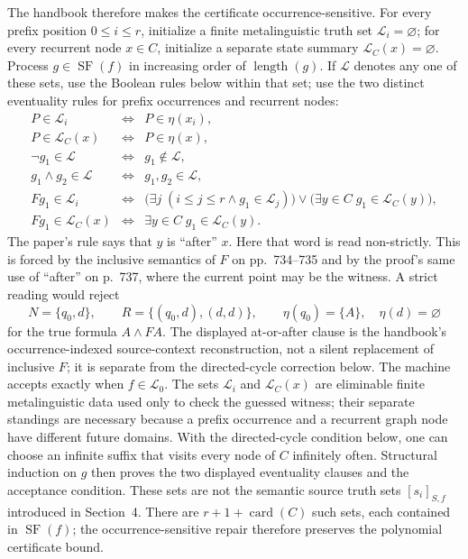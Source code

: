 The handbook therefore makes the certificate occurrence-sensitive.  For every
prefix position \(0\le i\le r\), initialize a finite metalinguistic truth set
\(\mathcal L_i=\varnothing\); for every recurrent node \(x\in C\), initialize
a separate state summary \(\mathcal L_C(x)=\varnothing\).  Process
\(g\in\operatorname{SF}(f)\) in increasing order of
\(\operatorname{length}(g)\).  If \(\mathcal L\) denotes any one of these
sets, use the Boolean rules below within that set; use the two distinct
eventuality rules for prefix occurrences and recurrent nodes:
\[
\begin{array}{rcl}
 P\in\mathcal L_i
 &\Longleftrightarrow& P\in\eta(x_i),\\
 P\in\mathcal L_C(x)
 &\Longleftrightarrow& P\in\eta(x),\\
 \neg g_1\in\mathcal L
 &\Longleftrightarrow& g_1\notin\mathcal L,\\
 g_1\land g_2\in\mathcal L
 &\Longleftrightarrow& g_1,g_2\in\mathcal L,\\
 Fg_1\in\mathcal L_i
 &\Longleftrightarrow&
 \bigl(\exists j\;(i\le j\le r\land g_1\in\mathcal L_j)\bigr)
 \lor
 \bigl(\exists y\in C\;g_1\in\mathcal L_C(y)\bigr),\\
 Fg_1\in\mathcal L_C(x)
 &\Longleftrightarrow&
 \exists y\in C\;g_1\in\mathcal L_C(y).
\end{array}
\]
The paper's rule says that \(y\) is ``after'' \(x\).  Here that word is read
non-strictly.  This is forced by the inclusive semantics of \(F\) on
pp.~734--735 and by the proof's same use of ``after'' on p.~737, where the
current point may be the witness.  A strict reading would reject
\[
 N=\{q_0,d\},\qquad R=\{(q_0,d),(d,d)\},\qquad
 \eta(q_0)=\{A\},\quad\eta(d)=\varnothing
\]
for the true formula \(A\land FA\).  The displayed at-or-after clause is the
handbook's occurrence-indexed source-context reconstruction, not a silent
replacement of inclusive \(F\); it is separate from the directed-cycle
correction below.
The machine accepts exactly when
\(f\in\mathcal L_0\).  The sets \(\mathcal L_i\) and \(\mathcal L_C(x)\) are
eliminable finite metalinguistic data used only to check the guessed witness;
their separate standings are necessary because a prefix occurrence and a
recurrent graph node have different future domains.  With the directed-cycle
condition below, one can choose an infinite suffix that visits every node of
\(C\) infinitely often.  Structural induction on \(g\) then proves the two
displayed eventuality clauses and the acceptance condition.  These sets are
not the semantic source truth sets
\([s_i]_{S,f}\) introduced in Section~4.  There are
\(r+1+\operatorname{card}(C)\) such sets, each contained in
\(\operatorname{SF}(f)\); the occurrence-sensitive repair therefore preserves
the polynomial certificate bound.

